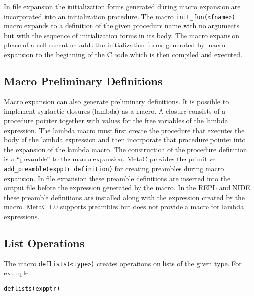 \documentclass{article}
\begin{document}
In file expansion the initialization forms generated during macro expansion are incorporated into an initialization procedure.
The macro {\tt init\_fun(<fname>)} macro expands to a definition of the given procedure name with no arguments but with the sequence
of initialization forms in its body.  The macro expansion phase of a cell execution adds the initialization forms generated by macro expansion
to the beginning of the C code which is then compiled and executed.

\subsection{Macro Preliminary Definitions}


Macro expansion can also generate preliminary definitions.  It is
possible to implement syntactic closures (lambda) as a macro.  A
closure consists of a procedure pointer together with values for the
free variables of the lambda expression.  The lambda macro
must first create the procedure that executes the body of the lambda
expression and then incorporate that procedure pointer into the
expansion of the lambda macro.  The construction of the procedure
definition is a ``preamble'' to the macro expansion.  MetaC provides
the primitive {\tt add\_preamble(expptr definition)} for creating
preambles during macro expansion.  In file expansion these preamble
definitions are inserted into the output file before the expression
generated by the macro.  In the REPL and NIDE these preamble
definitions are installed along with the expression created by the
macro.  MetaC 1.0 supports preambles but does not provide a macro for
lambda expressions.

\subsection{List Operations}

The macro {\tt deflists(<type>)} creates operations on lists of the given type.  For example

\medskip
\centerline{\tt deflists(expptr)}
\end{document}

